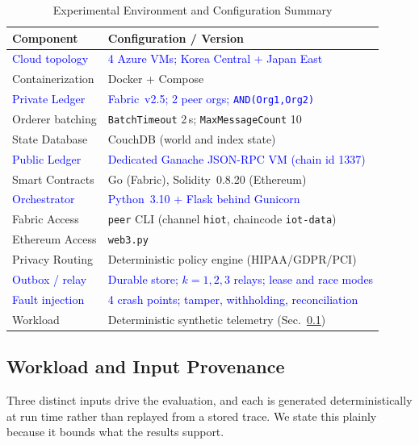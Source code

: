 \documentclass[final,5p,times,twocolumn]{elsarticle}
\begin{document}
\begin{table}[!htbp]
\centering
\caption{Experimental Environment and Configuration Summary}
\label{tab:env}
\renewcommand{\arraystretch}{1.05}
\setlength{\tabcolsep}{3pt}
\scriptsize
\begin{tabular}{@{}p{}p{}@{}}
\toprule
\textbf{Component} & \textbf{Configuration / Version} \\ \midrule
\textcolor{blue}{Cloud topology} & \textcolor{blue}{4 Azure VMs; Korea Central + Japan East} \\
Containerization & Docker + Compose \\
\textcolor{blue}{Private Ledger} & \textcolor{blue}{Fabric~v2.5; 2 peer orgs; \texttt{AND(Org1,Org2)}} \\
Orderer batching & \texttt{BatchTimeout} 2\,s; \texttt{MaxMessageCount} 10 \\
State Database & CouchDB (world and index state) \\
\textcolor{blue}{Public Ledger} & \textcolor{blue}{Dedicated Ganache JSON-RPC VM (chain id 1337)} \\
Smart Contracts & Go (Fabric), Solidity~0.8.20 (Ethereum) \\
\textcolor{blue}{Orchestrator} & \textcolor{blue}{Python~3.10 + Flask behind Gunicorn} \\
Fabric Access & \texttt{peer} CLI (channel \texttt{hiot}, chaincode \texttt{iot-data}) \\
Ethereum Access & \texttt{web3.py} \\
Privacy Routing & Deterministic policy engine (HIPAA/GDPR/PCI) \\
\textcolor{blue}{Outbox / relay} & \textcolor{blue}{Durable store; $k=1,2,3$ relays; lease and race modes} \\
\textcolor{blue}{Fault injection} & \textcolor{blue}{4 crash points; tamper, withholding, reconciliation} \\
Workload & Deterministic synthetic telemetry (Sec.~\ref{sec:dataset}) \\
\bottomrule
\end{tabular}
\end{table}

\subsection{\textbf{Workload and Input Provenance}}
\label{sec:dataset}
Three distinct inputs drive the evaluation, and each is generated deterministically at run time rather than replayed from a stored trace. We state this plainly because it bounds what the results support.
\end{document}
